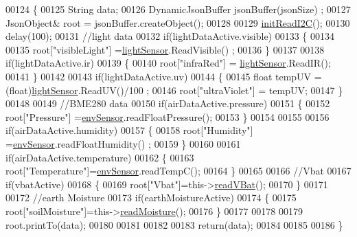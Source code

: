 \begin{DoxyCode}
00124 \{
00125     String data;
00126     DynamicJsonBuffer  jsonBuffer(jsonSize) ;
00127     JsonObject& root = jsonBuffer.createObject();
00128     
00129     \hyperlink{class_cool_board_sensors_acad6a8418c66d36868caca23c844ecb6}{initReadI2C}();
00130     delay(100);
00131     \textcolor{comment}{//light data}
00132     \textcolor{keywordflow}{if}(lightDataActive.visible)
00133     \{
00134 
00135         root[\textcolor{stringliteral}{"visibleLight"}] =\hyperlink{class_cool_board_sensors_a3e397300fb707dd193e909a757bf6102}{lightSensor}.ReadVisible() ;
00136     \}
00137     
00138     \textcolor{keywordflow}{if}(lightDataActive.ir)
00139     \{
00140         root[\textcolor{stringliteral}{"infraRed"}] = \hyperlink{class_cool_board_sensors_a3e397300fb707dd193e909a757bf6102}{lightSensor}.ReadIR();
00141     \}
00142 
00143     \textcolor{keywordflow}{if}(lightDataActive.uv)
00144     \{
00145         \textcolor{keywordtype}{float} tempUV = (float)\hyperlink{class_cool_board_sensors_a3e397300fb707dd193e909a757bf6102}{lightSensor}.ReadUV()/100 ;
00146         root[\textcolor{stringliteral}{"ultraViolet"}] = tempUV;
00147     \}
00148     
00149     \textcolor{comment}{//BME280 data}
00150     \textcolor{keywordflow}{if}(airDataActive.pressure)  
00151     \{
00152         root[\textcolor{stringliteral}{"Pressure"}] =\hyperlink{class_cool_board_sensors_a868e38985e9a2412829fa2790ca13e2e}{envSensor}.readFloatPressure();
00153     \}
00154     
00155         
00156     \textcolor{keywordflow}{if}(airDataActive.humidity)  
00157     \{   
00158         root[\textcolor{stringliteral}{"Humidity"}] =\hyperlink{class_cool_board_sensors_a868e38985e9a2412829fa2790ca13e2e}{envSensor}.readFloatHumidity() ;
00159     \}   
00160     
00161     \textcolor{keywordflow}{if}(airDataActive.temperature)
00162     \{
00163         root[\textcolor{stringliteral}{"Temperature"}]=\hyperlink{class_cool_board_sensors_a868e38985e9a2412829fa2790ca13e2e}{envSensor}.readTempC();
00164     \}
00165     
00166     \textcolor{comment}{//Vbat}
00167     \textcolor{keywordflow}{if}(vbatActive)  
00168     \{   
00169         root[\textcolor{stringliteral}{"Vbat"}]=this->\hyperlink{class_cool_board_sensors_a6944b6ea7bce8e2fce1b434acfd9d5f3}{readVBat}();
00170     \}
00171     
00172     \textcolor{comment}{//earth Moisture}
00173     \textcolor{keywordflow}{if}(earthMoistureActive)
00174     \{   
00175         root[\textcolor{stringliteral}{"soilMoisture"}]=this->\hyperlink{class_cool_board_sensors_a8761bff50373c485f4465c8db47d0633}{readMoisture}();
00176     \}
00177     
00178     
00179     root.printTo(data);
00180     
00181 
00182 
00183     \textcolor{keywordflow}{return}(data);
00184     
00185 
00186 \}
\end{DoxyCode}
